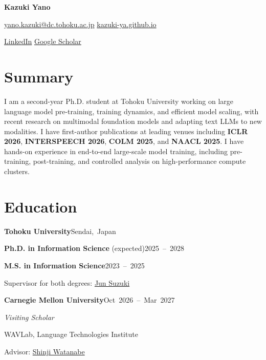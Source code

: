 \documentclass[a4paper,11pt]{article}
\newcommand{\roleline}[3]{%
  \par\addvspace{5pt}\Needspace{4\baselineskip}%
  \noindent\textbf{#1}\hfill\mbox{\small #3}\par\nobreak
  {\itshape #2\par}\nobreak}
\begin{document}
\RaggedRight
\setlength{\emergencystretch}{1em}
\begin{center}
  {\fontsize{26}{30}\selectfont\bfseries Kazuki Yano}\par
  \vspace{5pt}
  {\small
  \href{mailto:yano.kazuki@dc.tohoku.ac.jp}{yano.kazuki@dc.tohoku.ac.jp}
  \quad\textbar\quad
  \href{https://kazuki-ya.github.io}{kazuki-ya.github.io}\par
  \vspace{2pt}
  \href{https://www.linkedin.com/in/kazuki-yano}{LinkedIn}
  \quad\textbar\quad
  \href{https://scholar.google.com/citations?user=KnttZUwAAAAJ&hl=en}{Google Scholar}}
\end{center}
\section{Summary}
I am a second-year Ph.D. student at Tohoku University working on large language model pre-training, training dynamics, and efficient model scaling, with recent research on multimodal foundation models and adapting text LLMs to new modalities.
I have first-author publications at leading venues including \textbf{ICLR 2026}, \textbf{INTERSPEECH 2026}, \textbf{COLM 2025}, and \textbf{NAACL 2025}.
I have hands-on experience in end-to-end large-scale model training, including pre-training, post-training, and controlled analysis on high-performance compute clusters.

\section{Education}
\textbf{Tohoku University}\hfill\mbox{Sendai, Japan}\par
\textbf{Ph.D. in Information Science} (expected)\hfill\mbox{2025 -- 2028}\par
\textbf{M.S. in Information Science}\hfill\mbox{2023 -- 2025}\par
{\small Supervisor for both degrees: \href{https://www.fai.cds.tohoku.ac.jp/members/js/}{Jun Suzuki}\par}
\roleline{Carnegie Mellon University}{Visiting Scholar}{Oct 2026 -- Mar 2027}
{\small WAVLab, Language Technologies Institute\par
Advisor: \href{https://sw005320.github.io/}{Shinji Watanabe}\par}
\end{document}
